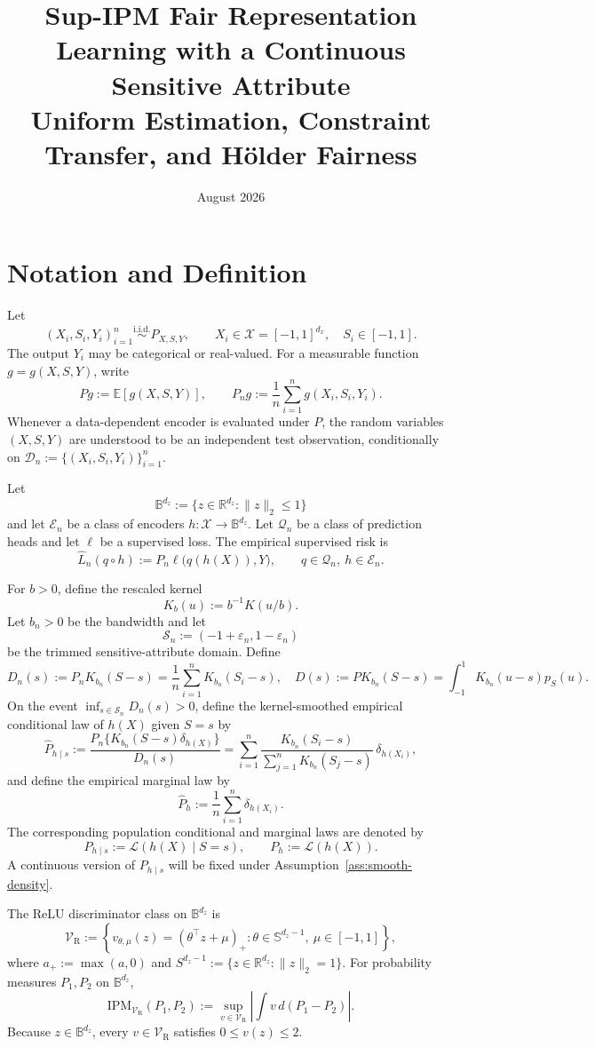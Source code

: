\documentclass[11pt]{article}
\title{Sup-IPM Fair Representation Learning with a Continuous Sensitive Attribute\\
\large Uniform Estimation, Constraint Transfer, and H\"older Fairness}
\author{}
\date{August 2026}
\theoremstyle{remark}
\newcommand{\R}{\mathbb{R}}
\newcommand{\E}{\mathbb{E}}
\newcommand{\cX}{\mathcal{X}}
\newcommand{\cS}{\mathcal{S}}
\newcommand{\cV}{\mathcal{V}}
\newcommand{\cE}{\mathscr{E}}
\newcommand{\cQ}{\mathscr{Q}}
\newcommand{\cD}{\mathcal{D}}
\newcommand{\cB}{\mathbb{B}}
\newcommand{\wh}{\widehat}
\newcommand{\eps}{\varepsilon}
\begin{document}
\maketitle
\tableofcontents
\newpage

\section{Notation and Definition}

Let
\[
  (X_i,S_i,Y_i)_{i=1}^n \overset{\mathrm{i.i.d.}}{\sim} P_{X,S,Y},
  \qquad
  X_i\in\cX=[-1,1]^{d_x},\quad S_i\in[-1,1].
\]
The output $Y_i$ may be categorical or real-valued.  For a measurable function
$g=g(X,S,Y)$, write
\[
  Pg:=\E[g(X,S,Y)],
  \qquad
  P_ng:=\frac{1}{n}\sum_{i=1}^n g(X_i,S_i,Y_i).
\]
Whenever a data-dependent encoder is evaluated under $P$, the random variables
$(X,S,Y)$ are understood to be an independent test observation, conditionally on
$\cD_n:=\{(X_i,S_i,Y_i)\}_{i=1}^n$.

Let
\[
  \cB^{d_z}:=\{z\in\R^{d_z}:\|z\|_2\le 1\}
\]
and let $\cE_n$ be a class of encoders $h:\cX\to\cB^{d_z}$.  Let
$\cQ_n$ be a class of prediction heads and let $\ell$ be a supervised loss.  The
empirical supervised risk is
\[
  \wh L_n(q \circ h):=P_n\ell\bigl(q(h(X)),Y\bigr),
  \qquad q\in\cQ_n,\ h\in\cE_n.
\]

For $b>0$, define the rescaled kernel
\[
  K_b(u):=b^{-1}K(u/b).
\]
Let $b_n>0$ be the bandwidth and let
\[
  \cS_n:=(-1+\eps_n,1-\eps_n)
\]
be the trimmed sensitive-attribute domain.  Define
\[
  D_n(s):=P_n K_{b_n}(S-s) = \frac{1}{n} \sum_{i=1}^{n}  K_{b_n}(S_i-s),
  \quad
  D(s):=PK_{b_n}(S-s) = \int_{-1}^{1} K_{b_n}(u-s)p_{S}(u) .
\]
On the event $\inf_{s\in\cS_n}D_n(s)>0$, define the kernel-smoothed empirical
conditional law of $h(X)$ given $S=s$ by
\[
  \wh P_{h\mid s}
  :=
  \frac{P_n\{K_{b_n}(S-s)\delta_{h(X)}\}}{D_n(s)}
  =\sum_{i=1}^n
  \frac{K_{b_n}(S_i-s)}{\sum_{j=1}^nK_{b_n}(S_j-s)}\,
  \delta_{h(X_i)},
\]
and define the empirical marginal law by
\[
  \wh P_h:=\frac{1}{n}\sum_{i=1}^n\delta_{h(X_i)}.
\]
The corresponding population conditional and marginal laws are denoted by
\[
  P_{h\mid s}:=\mathcal L(h(X)\mid S=s),
  \qquad
  P_h:=\mathcal L(h(X)).
\]
A continuous version of $P_{h\mid s}$ will be fixed under Assumption~\ref{ass:smooth-density}.

The ReLU discriminator class on $\cB^{d_z}$ is
\[
  \cV_{\mathrm{R}}
  :=
  \left\{
    v_{\theta,\mu}(z)=(\theta^\top z+\mu)_+:
    \theta\in\mathbb S^{d_z-1},\ \mu\in[-1,1]
  \right\},
\]
where $a_+:=\max(a,0)$ and $ S^{d_z-1} :=\{z\in\R^{d_z}:\|z\|_2 = 1\} $.  For probability measures $P_1,P_2$ on $\cB^{d_z}$,
\[
  \mathrm{IPM}_{\cV_{\mathrm{R}}}(P_1,P_2)
  :=
  \sup_{v\in\cV_{\mathrm{R}}}
  \left|\int v\,d(P_1-P_2)\right|.
\]
Because $z\in\cB^{d_z}$, every $v\in\cV_{\mathrm{R}}$ satisfies
$0\le v(z)\le 2$.
\end{document}
